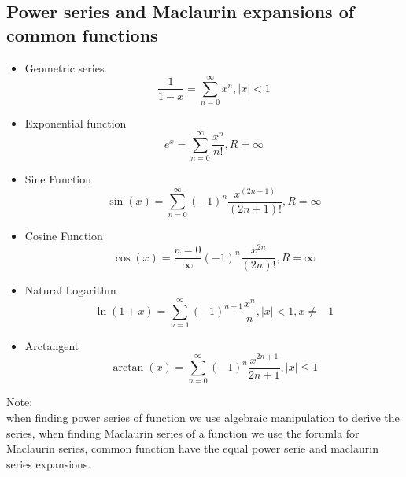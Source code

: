 \documentclass{article}
\begin{document}
                                        \subsection{Power series  and Maclaurin expansions of common functions}
                                            \begin{itemize}
                                                \item Geometric series 
                                                        \[\frac{1}{ 1 - x} = \sum_{n = 0}^{\infty} x^n , |x| < 1\]
                                                \item Exponential function 
                                                        \[e^x = \sum_{n = 0}^{\infty} \frac{x^n}{n!}, R = \infty\]
                                                \item Sine Function 
                                                        \[\sin(x) = \sum_{n = 0}^{\infty} {(-1)}^n \frac{{x}^{(2n + 1)}}{(2n + 1)!}, R = \infty\]
                                                \item Cosine Function 
                                                        \[\cos(x) = \frac{n = 0}{\infty} {(-1)}^{n} \frac{x^{2n}}{(2n)!},R = \infty \]
                                                \item Natural Logarithm   
                                                        \[\ln(1 + x) = \sum_{n = 1}^{\infty} {(-1)}^{n + 1} \frac{x^n}{n}, |x| < 1, x \neq -1\]
                                                \item Arctangent 
                                                        \[\arctan(x) = \sum_{n = 0}^{\infty}{(-1)}^n \frac{{x}^{2n + 1}}{2n + 1}, |x| \leq 1\]
                                            \end{itemize}
                                        Note: \\ 
                                        when finding power series of function we use algebraic manipulation to derive the series, when finding Maclaurin series of a function we use the forumla for Maclaurin series, common function have the equal power serie and maclaurin series expansions. 
\end{document}
